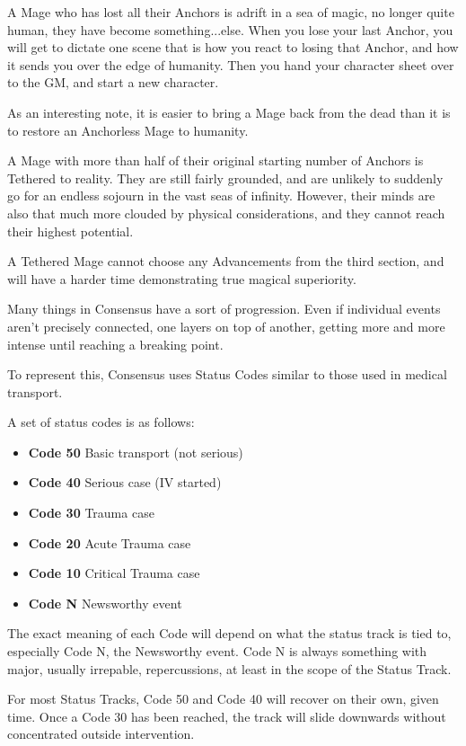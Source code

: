 \documentclass[letterpaper,12pt]{article}
\newcommand{\SECTION}[1]{\vspace{.5em}{\noindent\titlefont\large\textbf{#1}}

}
\begin{document}
A Mage who has lost all their Anchors is adrift in a sea of magic, no
longer quite human, they have become something...else. When you lose
your last Anchor, you will get to dictate one scene that is how you
react to losing that Anchor, and how it sends you over the edge of
humanity. Then you hand your character sheet over to the GM, and start
a new character.

As an interesting note, it is easier to bring a Mage back from the
dead than it is to restore an Anchorless Mage to humanity.

\SECTION{Tethered}
A Mage with more than half of their original starting number of
Anchors is Tethered to reality. They are still fairly grounded, and
are unlikely to suddenly go for an endless sojourn in the vast seas of
infinity. However, their minds are also that much more clouded by
physical considerations, and they cannot reach their highest
potential.

A Tethered Mage cannot choose any Advancements from the third section,
and will have a harder time demonstrating true magical superiority.

\SECTION{Status Tracks}
Many things in Consensus have a sort of progression. Even if
individual events aren't precisely connected, one layers on top of
another, getting more and more intense until reaching a breaking
point.

To represent this, Consensus uses Status Codes similar to those used
in medical transport.

A set of status codes is as follows:

\begin{itemize}
  \setlength{\itemsep}{0em}
\item \textbf{Code 50} Basic transport (not serious)
\item \textbf{Code 40} Serious case (IV started)
\item \textbf{Code 30} Trauma case
\item \textbf{Code 20} Acute Trauma case
\item \textbf{Code 10} Critical Trauma case
\item \textbf{Code N} Newsworthy event
\end{itemize}

The exact meaning of each Code will depend on what the status track is
tied to, especially Code N, the Newsworthy event. Code N is always
something with major, usually irrepable, repercussions, at least in
the scope of the Status Track.

For most Status Tracks, Code 50 and Code 40 will recover on their own,
given time. Once a Code 30 has been reached, the track will slide
downwards without concentrated outside intervention.
\end{document}
